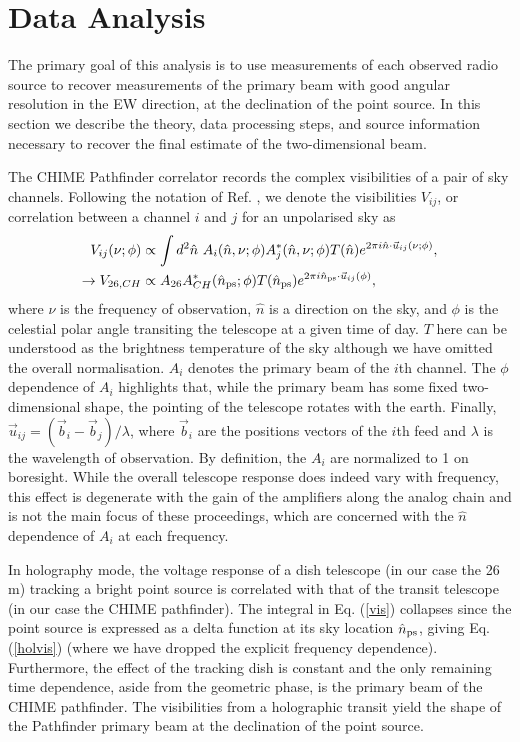 \section{Data Analysis} \label{sec2}
The primary goal of this analysis is to use measurements of each observed radio source to recover measurements of the primary beam with good angular resolution in the EW direction, at the declination of the point source. In this section we describe the theory, data processing steps, and source information necessary to recover the final estimate of the two-dimensional beam. 

The CHIME Pathfinder correlator records the complex visibilities of a pair of sky channels. Following the notation of Ref. \citep{mmodes1}, we denote the visibilities $V_{ij}$, or correlation between a channel $i$ and $j$ for an unpolarised sky as
\begin{align}
V_{ij}(\nu ; \phi) & \propto \int d^2\hat{n}~A_i(\hat{n}, \nu;\phi)A^*_j(\hat{n}, \nu;\phi) T(\hat{n}) e^{2\pi i \hat{n}\cdot\vec{u}_{ij}(\nu;\phi)},
\label{vis}
\\
\rightarrow V_{26,CH} & \propto A_{26}A^*_{CH}(\hat{n}_{\rm ps};\phi) T(\hat{n}_{\rm ps}) e^{2\pi i \hat{n}_{\rm ps}\cdot\vec{u}_{ij}(\phi)},
\label{holvis}
\end{align}
where $\nu$ is the frequency of observation, $\hat{n}$ is a direction on the sky, and $\phi$ is the celestial polar angle transiting the telescope at a given time of day. $T$ here can be understood as the brightness temperature of the sky although we have omitted the overall normalisation. $A_i$ denotes the primary beam of the $i$th channel. The $\phi$ dependence of $A_i$ highlights that, while the primary beam has some fixed two-dimensional shape, the pointing of the telescope rotates with the earth. Finally, $\vec{u}_{ij}=(\vec{b}_i - \vec{b}_j)/ \lambda$, where $\vec{b}_i$ are the positions vectors of the $i$th feed and $\lambda$ is the wavelength of observation. By definition, the $A_i$ are normalized to 1 on boresight. While the overall telescope response does indeed vary with frequency, this effect is degenerate with the gain of the amplifiers along the analog chain and is not the main focus of these proceedings, which are concerned with the $\hat{n}$ dependence of $A_i$ at each frequency. 

In holography mode, the voltage response of a dish telescope (in our case the 26 m) tracking a bright point source is correlated with that of the transit telescope (in our case the CHIME pathfinder). The integral in Eq. (\ref{vis}) collapses since the point source is expressed as a delta function at its sky location $\hat{n}_{\rm ps}$, giving Eq. (\ref{holvis}) (where we have dropped the explicit frequency dependence). Furthermore, the effect of the tracking dish is constant and the only remaining time dependence, aside from the geometric phase, is the primary beam of the CHIME pathfinder. The visibilities from a holographic transit yield the shape of the Pathfinder primary beam at the declination of the point source.

